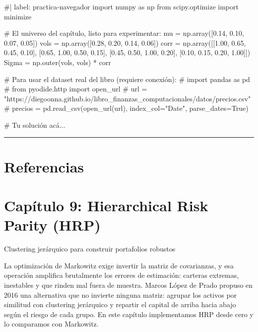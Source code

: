 \documentclass[
  spanish,
  letterpaper,
  DIV=11,
  numbers=noendperiod]{scrreprt}
\newenvironment{Shaded}{\begin{snugshade}}{\end{snugshade}}
\newcommand{\NormalTok}[1]{\textcolor[rgb]{0.00,0.23,0.31}{#1}}
\begin{document}
\begin{Shaded}
\begin{Highlighting}[]
\NormalTok{\#| label: practica{-}navegador}
\NormalTok{import numpy as np}
\NormalTok{from scipy.optimize import minimize}

\NormalTok{\# El universo del capítulo, listo para experimentar:}
\NormalTok{mu = np.array([0.14, 0.10, 0.07, 0.05])}
\NormalTok{vols = np.array([0.28, 0.20, 0.14, 0.06])}
\NormalTok{corr = np.array([[1.00, 0.65, 0.45, 0.10],}
\NormalTok{                 [0.65, 1.00, 0.50, 0.15],}
\NormalTok{                 [0.45, 0.50, 1.00, 0.20],}
\NormalTok{                 [0.10, 0.15, 0.20, 1.00]])}
\NormalTok{Sigma = np.outer(vols, vols) * corr}

\NormalTok{\# Para usar el dataset real del libro (requiere conexión):}
\NormalTok{\# import pandas as pd}
\NormalTok{\# from pyodide.http import open\_url}
\NormalTok{\# url = "https://diegoonna.github.io/libro\_finanzas\_computacionales/datos/precios.csv"}
\NormalTok{\# precios = pd.read\_csv(open\_url(url), index\_col="Date", parse\_dates=True)}

\NormalTok{\# Tu solución acá...}
\end{Highlighting}
\end{Shaded}

\begin{center}\rule{0.5\linewidth}{0.5pt}\end{center}

\chapter{Referencias}\label{referencias-7}

\label{refs}

\chapter{Capítulo 9: Hierarchical Risk Parity
(HRP)}\label{capuxedtulo-9-hierarchical-risk-parity-hrp}

Clustering jerárquico para construir portafolios robustos

La optimización de Markowitz exige invertir la matriz de covarianzas, y
esa operación amplifica brutalmente los errores de estimación: carteras
extremas, inestables y que rinden mal fuera de muestra. Marcos López de
Prado propuso en 2016 una alternativa que no invierte ninguna matriz:
agrupar los activos por similitud con clustering jerárquico y repartir
el capital de arriba hacia abajo según el riesgo de cada grupo. En este
capítulo implementamos HRP desde cero y lo comparamos con Markowitz.
\end{document}
